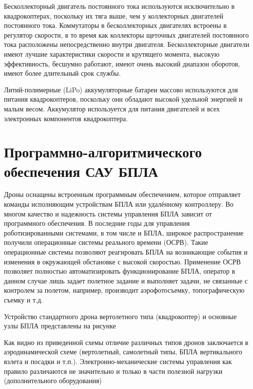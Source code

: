 \documentclass[nir, och, master]{SCWorks}
\begin{document}
Бесколлекторный двигатель постоянного тока используются исключительно в квадрокоптерах, 
поскольку их тяга выше, чем у коллекторных двигателей постоянного тока. Коммутаторы в 
бесколлекторных двигателях встроены в регулятор скорости, в то время как коллекторы 
щеточных двигателей постоянного тока расположены непосредственно внутри двигателя. 
Бесколлекторные двигатели имеют лучшие характеристики скорости и крутящего момента, 
высокую эффективность, бесшумно работают, имеют очень высокий диапазон оборотов, 
имеют более длительный срок службы.

Литий-полимерные (LiPo) аккумуляторные батареи массово используются для питания квадрокоптеров, 
поскольку они обладают высокой удельной энергией и малым весом. Аккумулятор используется 
для питания двигателей и всех электронных компонентов квадрокоптера.



\section{Программно-алгоритмического обеспечения САУ БПЛА}

Дроны оснащены встроенным программным обеспечением, которое отправляет команды исполняющим
устройствам БПЛА или удалённому контроллеру.
Во многом качество и надежность системы управления БПЛА зависит от программного обеспечения.
В последние годы для управления роботизированными системами, в том числе и БПЛА, широкое распространение получили операционные системы реального времени (ОСРВ). Такие операционные системы
позволяют реагировать БПЛА на возникающие события и изменения в окружающей обстановке с высокой скоростью. Применение ОСРВ позволяет полностью
автоматизировать функционирование БПЛА, оператор
в данном случае лишь задает полетное задание и выполняет задачи, не связанные с контролем за полетом,
например, производит аэрофотосъемку, топографическую съемку и т.д.


Устройство стандартного дрона вертолетного типа
(квадрокоптер) и основные узлы БПЛА представлены
на рисунке 

Как видно из приведенной схемы отличие различных
типов дронов заключается в аэродинамической схеме
(вертолетный, самолетный типы, БПЛА вертикального
взлета и посадки и т.п.). Электронно-механические системы управления как правило различаются не значительно и только в части полезной нагрузки (дополнительного оборудования)
\end{document}
